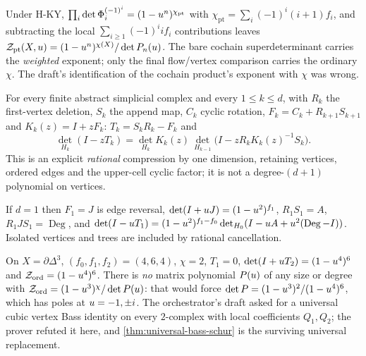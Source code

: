 \begin{theorem}
\label{thm:pointed-euler-exponent}
Under H-KY, $\prod_{i}\det\Phi_i^{(-1)^i} = (1-u^n)^{\chi_{\mathrm{pt}}}$ with %
$\chi_{\mathrm{pt}} = \sum_i(-1)^i(i+1)f_i$, and subtracting the local
$\sum_{i\ge1}(-1)^iif_i$ contributions leaves
$\mathcal Z_{\mathrm{pt}}(X,u) = (1-u^n)^{\chi(X)}/\det P_n(u)$. The bare
cochain superdeterminant carries the \emph{weighted} exponent; only the final
flow/vertex comparison carries the ordinary $\chi$. The draft's identification
of the cochain product's exponent with $\chi$ was wrong.
\end{theorem}

\begin{theorem}
\label{thm:universal-bass-schur}
For every finite abstract simplicial complex and every $1\le k\le d$, with
$R_k$ the first-vertex deletion, $S_k$ the append map, $C_k$ cyclic rotation,
$F_k = C_k+R_{k+1}S_{k+1}$ and $K_k(z) = I+zF_k$: $T_k = S_kR_k-F_k$ and
\[
 \det_{H_k}(I-zT_k) = \det_{H_k}K_k(z)\,
 \det_{H_{k-1}}\bigl(I-zR_kK_k(z)^{-1}S_k\bigr) .
\]
This is an explicit \emph{rational} compression by one dimension, retaining
vertices, ordered edges and the upper-cell cyclic factor; it is not a
degree-$(d+1)$ polynomial on vertices.
\end{theorem}

\begin{corollary}
\label{cor:bass-every-graph}
If $d = 1$ then $F_1 = J$ is edge reversal, $\det(I+u J) = (1-u^2)^{f_1}$,
$R_1S_1 = A$, $R_1JS_1 = \operatorname{Deg}$, and
$\det(I-u T_1) = (1-u^2)^{f_1-f_0}\det_{H_0}(I-u A+u^2(\operatorname{Deg}-I))$.
Isolated vertices and trees are included by rational cancellation.
\end{corollary}

\begin{proposition}
\label{prop:tetrahedron-obstruction}
On $X = \partial\Delta^3$, $(f_0,f_1,f_2) = (4,6,4)$, $\chi = 2$, $T_1 = 0$, %
$\det(I+u T_2) = (1-u^4)^6$ and $\mathcal Z_{\mathrm{ord}} = (1-u^4)^6$. There
is \emph{no} matrix polynomial $P(u)$ of any size or degree with
$\mathcal Z_{\mathrm{ord}} = (1-u^3)^{\chi}/\det P(u)$: that would force
$\det P = (1-u^3)^2/(1-u^4)^6$, which has poles at $u = -1,\pm i$. The
orchestrator's draft asked for a universal cubic vertex Bass identity on every
$2$-complex with local coefficients $Q_1,Q_2$; the prover refuted it here, and
\cref{thm:universal-bass-schur} is the surviving universal replacement.
\end{proposition}

